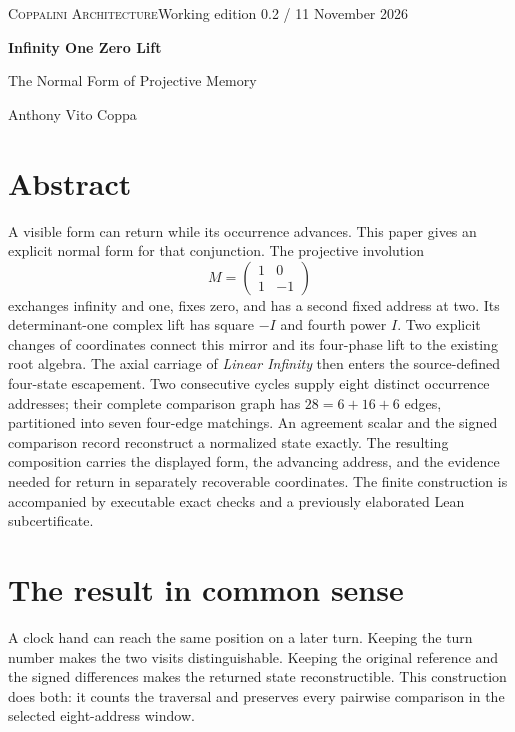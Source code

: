 \documentclass[11pt]{article}
\theoremstyle{definition}\newtheorem{definition}[theorem]{Definition}
\begin{document}
\hypersetup{pageanchor=false}

\hypersetup{pageanchor=true}
\setcounter{page}{1}

{\small\scshape Coppalini Architecture}\hfill{\small Working edition 0.2 / 11 November 2026}\par
\vspace{8pt}
{\LARGE\bfseries Infinity One Zero Lift}\par
{\large The Normal Form of Projective Memory}\par
Anthony Vito Coppa
\vspace{4pt}

\section*{Abstract}
A visible form can return while its occurrence advances. This paper gives an explicit normal form for that conjunction. The projective involution
\[
 M=\begin{pmatrix}1&0\\1&-1\end{pmatrix}
\]
exchanges infinity and one, fixes zero, and has a second fixed address at two. Its determinant-one complex lift has square $-I$ and fourth power $I$. Two explicit changes of coordinates connect this mirror and its four-phase lift to the existing root algebra. The axial carriage of \emph{Linear Infinity} then enters the source-defined four-state escapement. Two consecutive cycles supply eight distinct occurrence addresses; their complete comparison graph has $28=6+16+6$ edges, partitioned into seven four-edge matchings. An agreement scalar and the signed comparison record reconstruct a normalized state exactly. The resulting composition carries the displayed form, the advancing address, and the evidence needed for return in separately recoverable coordinates. The finite construction is accompanied by executable exact checks and a previously elaborated Lean subcertificate.

\section*{The result in common sense}
A clock hand can reach the same position on a later turn. Keeping the turn number makes the two visits distinguishable. Keeping the original reference and the signed differences makes the returned state reconstructible. This construction does both: it counts the traversal and preserves every pairwise comparison in the selected eight-address window.
\end{document}
